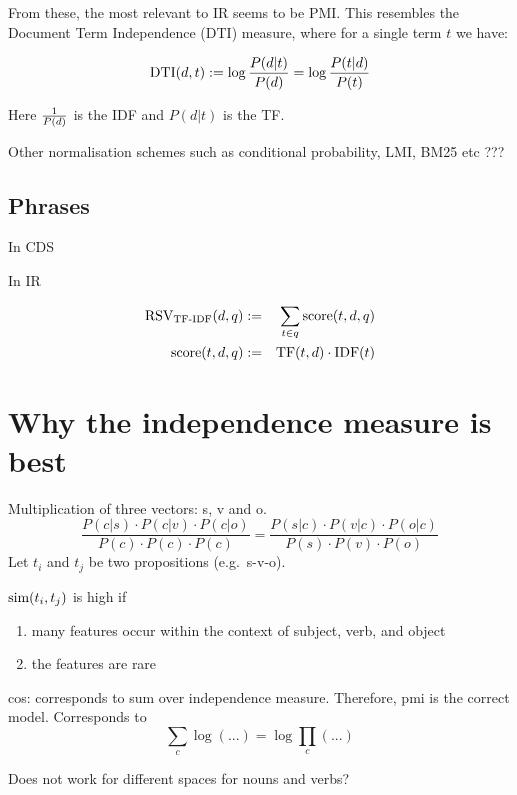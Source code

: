 From these,  the most relevant to IR seems to be PMI. This resembles the Document Term Independence (DTI) measure, where  for a single term $t$ we have:

\begin{equation}
\label{independence}
\textmd{DTI}(d,t) := \log\frac{P(d | t)}{P(d)} = \log\frac{P(t|d)}{P(t)}
\end{equation}


Here  ${1} \over {P(d)}$ is the IDF and  $P(d| t)$ is the TF. 





Other normalisation schemes such as conditional probability, LMI, BM25 etc ???

\subsection{Phrases}

In CDS


In IR



\begin{eqnarray}
\label{tf-idf-phrase}
\textmd{RSV}_\textmd{TF-IDF}(d,q) &:=& \sum_{t \in q} \textmd{score}(t,d,q)\\
\textmd{score}(t,d,q) &:=&
\textmd{TF}(t,d) \cdot \textmd{IDF}(t)
\end{eqnarray}

\section{Why the independence measure is best}

Multiplication of three vectors: s, v and o.
\[
\frac{
P(c|s) \cdot P(c|v) \cdot P(c|o)}{
P(c) \cdot P(c) \cdot P(c)} =
\frac{
P(s|c) \cdot P(v|c) \cdot P(o|c)
}{
P(s) \cdot P(v) \cdot P(o)
}
\]
Let $t_i$ and $t_j$ be two propositions
(e.g.~s-v-o).

$\textmd{sim}(t_i,t_j)$ is high if
\begin{enumerate}
\item many features occur within the context of subject, verb, and object
\item the features are rare
\end{enumerate}

cos: corresponds to sum over independence measure.
Therefore, pmi is the correct model.
Corresponds to
\[
\sum_c \log(...) = \log \prod_c(...)
\]



Does not work for different
spaces for nouns and verbs?

